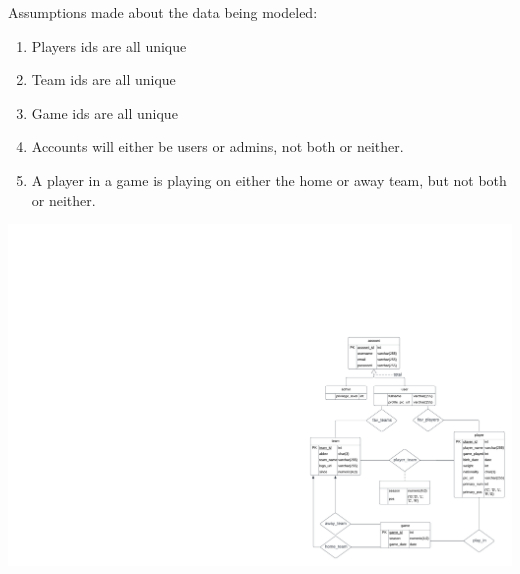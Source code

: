 \documentclass[11pt]{article}
\begin{document}
Assumptions made about the data being modeled:
\begin{enumerate}
    \item Players ids are all unique
    \item Team ids are all unique
    \item Game ids are all unique
    \item Accounts will either be users or admins, not both or neither.
    \item A player in a game is playing on either the home or away team, but not both or neither.
\end{enumerate}

\begin{center}
    \includegraphics[width=1\textwidth]{ER_Diagram.png}
\end{center}
\end{document}
